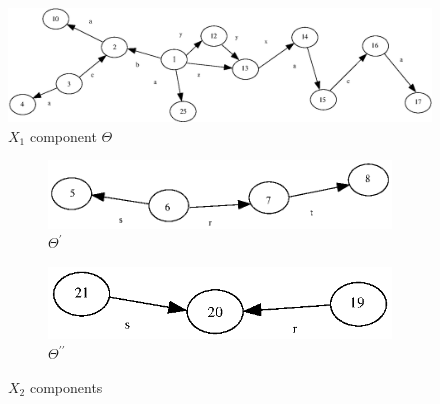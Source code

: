 \documentclass[a4paper,12pt]{article}
\numberwithin{equation}{section}
\numberwithin{figure}{section}
\begin{document}
\begin{figure}
\begin{center}
\includegraphics[scale=0.5, angle=90,bb=0 0 300 600]{python/ex_K_X.eps}
\caption{$X_1$ component $\Theta$}
\label{fig:KX}
\end{center}
\end{figure}

\begin{figure}
\begin{center}
\begin{subfigure}[b]{.3\columnwidth}
\includegraphics[scale=0.5, angle=90, bb=0 0  82 280]{python/ex_K_Y1.eps}
\caption{$\Theta^\prime$}
\label{fig:KY1}
\end{subfigure}
\hspace*{2cm}
\begin{subfigure}[b]{.3\columnwidth}
\includegraphics[scale=0.5, angle=90, bb=0 0 82 210]{python/ex_K_Y2.eps}
\caption{$\Theta^{\prime\prime}$}
\label{fig:KY2}
\end{subfigure}
\end{center}
\caption{$X_2$ components}
\label{fig:KY}
\end{figure}
\end{document}
